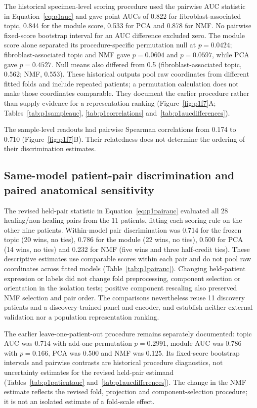 The historical specimen-level scoring procedure used the pairwise AUC statistic in Equation~\eqref{eq:p1auc} and gave point AUCs of 0.822 for fibroblast-associated topic, 0.844 for the module score, 0.533 for PCA and 0.878 for NMF. No pairwise fixed-score bootstrap interval for an AUC difference excluded zero. The module score alone separated its procedure-specific permutation null at $p=0.0424$; fibroblast-associated topic and NMF gave $p=0.0604$ and $p=0.0597$, while PCA gave $p=0.4527$. Null means also differed from 0.5 (fibroblast-associated topic, 0.562; NMF, 0.553). These historical outputs pool raw coordinates from different fitted folds and include repeated patients; a permutation calculation does not make those coordinates comparable. They document the earlier procedure rather than supply evidence for a representation ranking (Figure~\ref{fig:p1f7}A\label{call:p1f7}; Tables~\ref{tab:p1sampleauc}, \ref{tab:p1correlations} and~\ref{tab:p1aucdifferences}).

The sample-level readouts had pairwise Spearman correlations from 0.174 to 0.710 (Figure~\ref{fig:p1f7}B). Their relatedness does not determine the ordering of their discrimination estimates.



\subsection{Same-model patient-pair discrimination and paired anatomical sensitivity}

The revised held-pair statistic in Equation~\eqref{eq:p1pairauc} evaluated all 28 healing/non-healing pairs from the 11 patients, fitting each scoring rule on the other nine patients. Within-model pair discrimination was 0.714 for the frozen topic (20 wins, no ties), 0.786 for the module (22 wins, no ties), 0.500 for PCA (14 wins, no ties) and 0.232 for NMF (five wins and three half-credit ties). These descriptive estimates use comparable scores within each pair and do not pool raw coordinates across fitted models (Table~\ref{tab:p1pairauc}). Changing held-patient expression or labels did not change fold preprocessing, component selection or orientation in the isolation tests; positive component rescaling also preserved NMF selection and pair order. The comparisons nevertheless reuse 11 discovery patients and a discovery-trained panel and encoder, and establish neither external validation nor a population representation ranking.

The earlier leave-one-patient-out procedure remains separately documented: topic AUC was 0.714 with add-one permutation $p=0.2991$, module AUC was 0.786 with $p=0.166$, PCA was 0.500 and NMF was 0.125. Its fixed-score bootstrap intervals and pairwise contrasts are historical procedure diagnostics, not uncertainty estimates for the revised held-pair estimand (Tables~\ref{tab:p1patientauc} and~\ref{tab:p1aucdifferences}). The change in the NMF estimate reflects the revised fold, projection and component-selection procedure; it is not an isolated estimate of a fold-scale effect.

